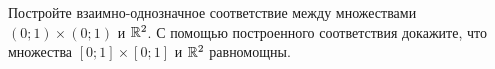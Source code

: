 \documentclass[12pt, a4paper, oneside]{article}
\begin{document}



\begin{problem}{}
Постройте взаимно-однозначное соответствие между множествами $(0;1) \times (0;1)$ и $\mathbb R^{2}$. С помощью построенного соответствия докажите, что множества $[0;1] \times [0;1]$ и $\mathbb R^{2}$ равномощны.
\end{problem}







\end{document}
